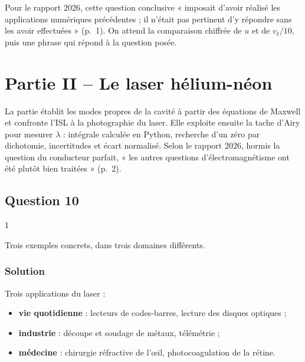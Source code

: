 \documentclass[11pt,a4paper]{article}
\providecommand{\tightlist}{\setlength{\itemsep}{0pt}\setlength{\parskip}{0pt}}
\begin{document}
\begin{jury}

Pour le rapport 2026, cette question conclusive « imposait d'avoir réalisé les applications numériques précédentes ; il n'était pas pertinent d'y répondre sans les avoir effectuées » (p.~1). On attend la comparaison chiffrée de \(u\) et de \(v_\ell/10\), puis une phrase qui répond à la question posée.

\end{jury}

\hypertarget{partie-ii-le-laser-huxe9lium-nuxe9on}{%
\section{Partie II -- Le laser hélium-néon}\label{partie-ii-le-laser-huxe9lium-nuxe9on}}

La partie établit les modes propres de la cavité à partir des équations de Maxwell et confronte l'ISL à la photographie du laser. Elle exploite ensuite la tache d'Airy pour mesurer \(\lambda\) : intégrale calculée en Python, recherche d'un zéro par dichotomie, incertitudes et écart normalisé. Selon le rapport 2026, hormis la question du conducteur parfait, « les autres questions d'électromagnétisme ont été plutôt bien traitées » (p.~2).

\hypertarget{question-10}{%
\subsection{Question 10}\label{question-10}}

\begin{indication}{1}

Trois exemples concrets, dans trois domaines différents.

\end{indication}

\hypertarget{solution-9}{%
\subsubsection{Solution}\label{solution-9}}

Trois applications du laser :

\begin{itemize}
\tightlist
\item
  \textbf{vie quotidienne} : lecteurs de codes-barres, lecture des disques optiques ;
\item
  \textbf{industrie} : découpe et soudage de métaux, télémétrie ;
\item
  \textbf{médecine} : chirurgie réfractive de l'œil, photocoagulation de la rétine.
\end{itemize}
\end{document}
